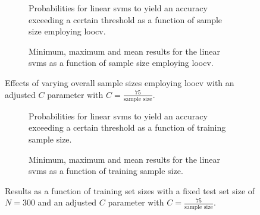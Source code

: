\begin{figure}[ht]
    \captionsetup[subfigure]{justification=justified,singlelinecheck=false}
    \begin{subfigure}[t]{0.61\textwidth}
        
        \caption{Probabilities for linear \acp{svm} to yield an accuracy exceeding a certain threshold as a function of sample size employing \ac{loocv}.}
    \end{subfigure}
    \hspace{3.0mm}
    \begin{subfigure}[t]{0.34\textwidth}
        
        \caption{Minimum, maximum and mean results for the linear \acp{svm} as a function of sample size employing \ac{loocv}. }
    \end{subfigure}
    \caption[Effects of varying overall sample sizes with an adjusted $C$ parameter.]{Effects of varying overall sample sizes employing \ac{loocv} with an adjusted $C$ parameter with $C=\frac{75}{\text{sample size}}$.}
    \label{fig:adj_c_overall}
\end{figure}

\begin{figure}[ht]
    \captionsetup[subfigure]{justification=justified,singlelinecheck=false}
    \begin{subfigure}[t]{0.61\textwidth}
        
        \caption{Probabilities for linear \acp{svm} to yield an accuracy exceeding a certain threshold as a function of training sample size.}
    \end{subfigure}
    \hspace{3.0mm}
    \begin{subfigure}[t]{0.34\textwidth}
        
        \caption{Minimum, maximum and mean results for the linear \acp{svm} as a function of training sample size.}
    \end{subfigure}
    \caption[Effects of varying train sample sizes with an adjusted $C$ parameter.]{Results as a function of training set sizes with a fixed test set size of $N = 300$ and an adjusted $C$ parameter with $C=\frac{75}{\text{sample size}}$.}
    \label{fig:adj_c_test}
\end{figure}
\FloatBarrier


